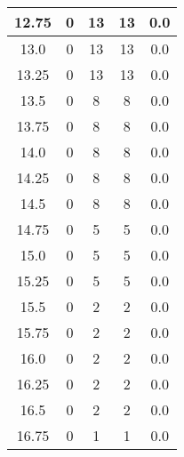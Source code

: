 \documentclass[letterpaper, 12pt]{article}
\begin{document}
\begin{longtable}{|c|c|c|c|c|}
\hline
12.75 & 0 & 13 & 13 & 0.0 \\
\hline
13.0 & 0 & 13 & 13 & 0.0 \\
\hline
13.25 & 0 & 13 & 13 & 0.0 \\
\hline
13.5 & 0 & 8 & 8 & 0.0 \\
\hline
13.75 & 0 & 8 & 8 & 0.0 \\
\hline
14.0 & 0 & 8 & 8 & 0.0 \\
\hline
14.25 & 0 & 8 & 8 & 0.0 \\
\hline
14.5 & 0 & 8 & 8 & 0.0 \\
\hline
14.75 & 0 & 5 & 5 & 0.0 \\
\hline
15.0 & 0 & 5 & 5 & 0.0 \\
\hline
15.25 & 0 & 5 & 5 & 0.0 \\
\hline
15.5 & 0 & 2 & 2 & 0.0 \\
\hline
15.75 & 0 & 2 & 2 & 0.0 \\
\hline
16.0 & 0 & 2 & 2 & 0.0 \\
\hline
16.25 & 0 & 2 & 2 & 0.0 \\
\hline
16.5 & 0 & 2 & 2 & 0.0 \\
\hline
16.75 & 0 & 1 & 1 & 0.0 \\
\hline
\end{longtable}
\end{document}
